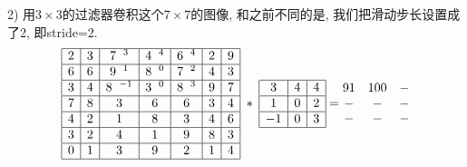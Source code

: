 \begin{example}
2) 用$3\times 3$的过滤器卷积这个$7\times 7$的图像, 和之前不同的是, 我们把滑动步长设置成了2, 即stride=2.
\begin{align*}
\begin{array}{|c|c|c|c|c|c|c|}
\hline 2 & 3 & 7\;\; ^{3} & 4\;\; ^{4} & 6\;\; ^{4} & 2 & 9 \\
\hline 6 & 6 & 9\;\; ^{1} & 8\;\; ^{0} & 7\;\; ^{2} & 4 & 3 \\
\hline 3 & 4 & 8\;\; ^{-1} & 3\;\; ^{0} & 8\;\; ^{3} & 9 & 7 \\
\hline 7 & 8 & 3 & 6 & 6 & 3 & 4 \\
\hline 4 & 2 & 1 & 8 & 3 & 4 & 6 \\
\hline 3 & 2 & 4 & 1 & 9 & 8 & 3 \\
\hline 0 & 1 & 3 & 9 & 2 & 1 & 4 \\
\hline
\end{array}
\;*\;
\begin{array}{|c|c|c|}
\hline 3 & 4 & 4 \\
\hline 1 & 0 & 2 \\
\hline-1 & 0 & 3 \\
\hline
\end{array}
=
\begin{matrix}
91 &100&- \\
-&- &- \\
-&- &-\\
\end{matrix}
\end{align*}


\end{example}
